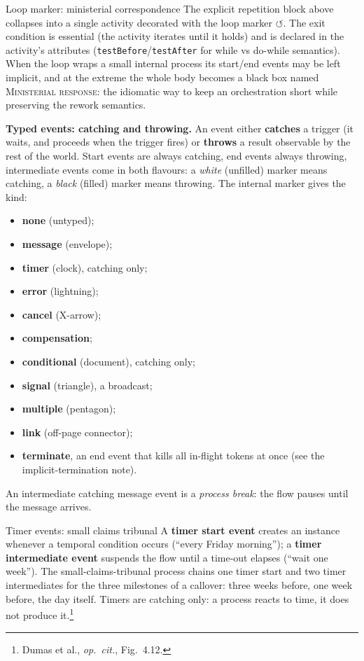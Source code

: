 \begin{examplebox}{Loop marker: ministerial correspondence}
The explicit repetition block above collapses into a single activity decorated with the loop marker $\circlearrowleft$. The exit condition is essential (the activity iterates until it holds) and is declared in the activity's attributes (\texttt{testBefore}/\texttt{testAfter} for while vs do-while semantics). When the loop wraps a small internal process its start/end events may be left implicit, and at the extreme the whole body becomes a black box named \textsc{Ministerial response}: the idiomatic way to keep an orchestration short while preserving the rework semantics.
\end{examplebox}

\textbf{Typed events: catching and throwing.} An event either \textbf{catches} a trigger (it waits, and proceeds when the trigger fires) or \textbf{throws} a result observable by the rest of the world. Start events are always catching, end events always throwing, intermediate events come in both flavours: a \emph{white} (unfilled) marker means catching, a \emph{black} (filled) marker means throwing. The internal marker gives the kind:
\begin{itemize}
  \item \textbf{none} (untyped);
  \item \textbf{message} (envelope);
  \item \textbf{timer} (clock), catching only;
  \item \textbf{error} (lightning);
  \item \textbf{cancel} (X-arrow);
  \item \textbf{compensation};
  \item \textbf{conditional} (document), catching only;
  \item \textbf{signal} (triangle), a broadcast;
  \item \textbf{multiple} (pentagon);
  \item \textbf{link} (off-page connector);
  \item \textbf{terminate}, an end event that kills all in-flight tokens at once (see the implicit-termination note).
\end{itemize}

An intermediate catching message event is a \emph{process break}: the flow pauses until the message arrives.

\begin{examplebox}{Timer events: small claims tribunal}
A \textbf{timer start event} creates an instance whenever a temporal condition occurs (``every Friday morning''); a \textbf{timer intermediate event} suspends the flow until a time-out elapses (``wait one week''). The small-claims-tribunal process chains one timer start and two timer intermediates for the three milestones of a callover: three weeks before, one week before, the day itself. Timers are catching only: a process reacts to time, it does not produce it.\footnote{Dumas et al., \emph{op.~cit.}, Fig.~4.12.}
\end{examplebox}

